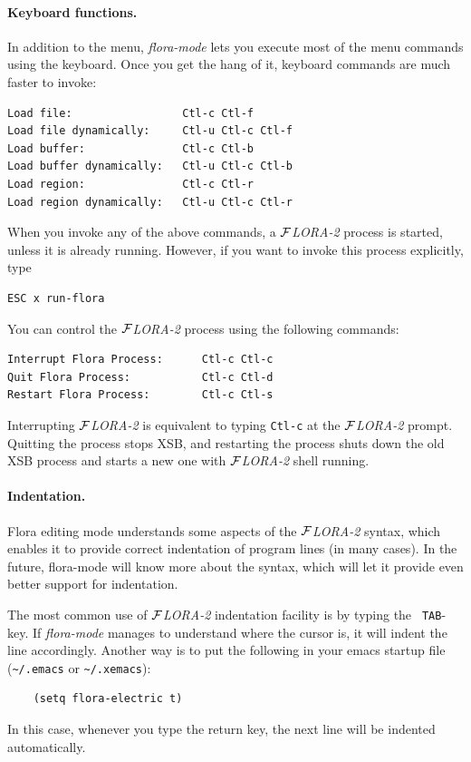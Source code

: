\documentclass[11pt]{article}
\newcommand{\FLORA}{{\mbox{${\cal F}${\small\it LORA}\rm\emph{-2}}}\xspace}
\begin{document}
\paragraph{Keyboard functions.}
In addition to the menu, \emph{flora-mode} lets you execute most of the
menu commands using the keyboard. Once you get the hang of it, keyboard
commands are much faster to invoke:
\begin{verbatim}
Load file:                 Ctl-c Ctl-f
Load file dynamically:     Ctl-u Ctl-c Ctl-f
Load buffer:               Ctl-c Ctl-b
Load buffer dynamically:   Ctl-u Ctl-c Ctl-b
Load region:               Ctl-c Ctl-r
Load region dynamically:   Ctl-u Ctl-c Ctl-r
\end{verbatim}
When you invoke any of the above commands, a \FLORA process is started,
unless it is already running. However, if you want to invoke this process
explicitly, type
\begin{verbatim}
ESC x run-flora  
\end{verbatim}
You can control the \FLORA process using the following commands:
\begin{verbatim}
Interrupt Flora Process:      Ctl-c Ctl-c
Quit Flora Process:           Ctl-c Ctl-d
Restart Flora Process:        Ctl-c Ctl-s
\end{verbatim}
Interrupting \FLORA is equivalent to typing {\tt Ctl-c} at the \FLORA
prompt. Quitting the process stops XSB, and restarting the process shuts
down the old XSB process and starts a new one with \FLORA shell running.

\paragraph{Indentation.}
Flora editing mode understands some aspects of the \FLORA syntax, which
enables it to provide correct indentation of program lines (in many cases).
In the future, flora-mode will know more about the syntax, which will let
it provide even better support for indentation.

The most common use of \FLORA indentation facility is by typing the {\tt
  TAB}-key. If \emph{flora-mode} manages to understand where the cursor is,
it will indent the line accordingly. Another way is to put the following in
your emacs startup file (\verb|~/.emacs| or \verb|~/.xemacs|):
\begin{verbatim}
    (setq flora-electric t)  
\end{verbatim}
In this case, whenever you type the return key, the next line will be
indented automatically.
\end{document}
